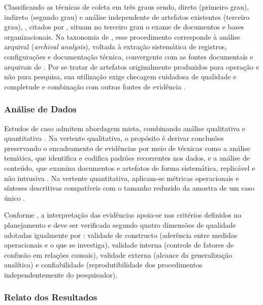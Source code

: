 Classificando as técnicas de coleta em três graus sendo, direto (primeiro grau), indireto (segundo grau) e análise independente de artefatos existentes (terceiro grau), , citados por , situam no terceiro grau o exame de documentos e bases organizacionais. Na taxonomia de , esse procedimento corresponde à análise arquival (\textit{archival analysis}), voltada à extração sistemática de registros, configurações e documentação técnica, convergente com as fontes documentais e arquivais de . Por se tratar de artefatos originalmente produzidos para operação e não para pesquisa, sua utilização exige checagem cuidadosa de qualidade e completude e combinação com outras fontes de evidência \cite{runeson2009,wohlin2024}.

\subsubsection{Análise de Dados}
\label{subsubsec:ref_ec_analise}

Estudos de caso admitem abordagem mista, combinando análise qualitativa e quantitativa \cite{runeson2009}. Na vertente qualitativa, o propósito é derivar conclusões preservando o encadeamento de evidências por meio de técnicas como a análise temática, que identifica e codifica padrões recorrentes nos dados, e a análise de conteúdo, que examina documentos e artefatos de forma sistemática, replicável e não intrusiva \cite{wohlin2024,runeson2009}. Na vertente quantitativa, aplicam-se métricas operacionais e sínteses descritivas compatíveis com o tamanho reduzido da amostra de um caso único \cite{runeson2009}.

Conforme , a interpretação das evidências apoia-se nos critérios definidos no planejamento e deve ser verificada segundo quatro dimensões de qualidade adotadas igualmente por : validade de constructo (aderência entre medidas operacionais e o que se investiga), validade interna (controle de fatores de confusão em relações causais), validade externa (alcance da generalização analítica) e confiabilidade (reprodutibilidade dos procedimentos independentemente do pesquisador).

\subsubsection{Relato dos Resultados}
\label{subsubsec:ref_ec_relato}

